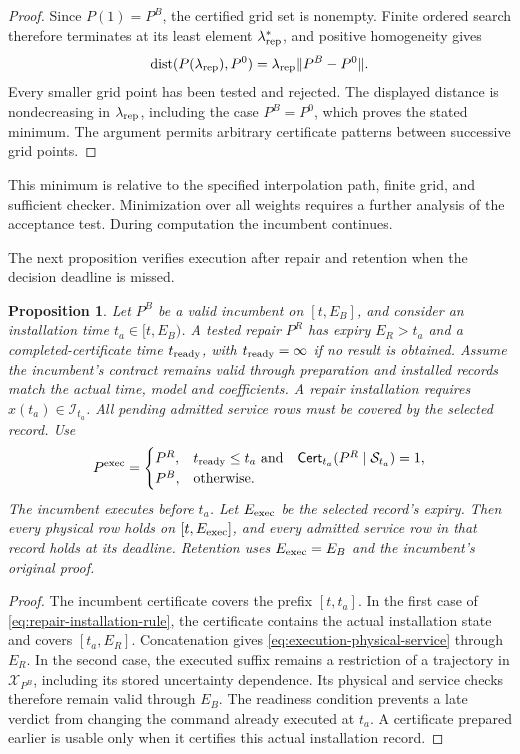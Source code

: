 \documentclass[preprint,12pt]{elsarticle}
\newtheorem{proposition}{Proposition}
\begin{document}
\begin{proof}
Since $P(1)=P^B$, the certified grid set is nonempty. Finite ordered search
therefore terminates at its least element $\lambda_{\rm rep}^*$, and positive
homogeneity gives
\[
\operatorname{dist}(P(\lambda_{\rm rep}),P^0)=\lambda_{\rm rep}\|P^B-P^0\|.
\]
Every smaller grid point has been tested and rejected. The displayed
distance is nondecreasing in $\lambda_{\rm rep}$, including the case $P^B=P^0$,
which proves the stated minimum. The argument permits arbitrary certificate
patterns between successive grid points.
\end{proof}

This minimum is relative to the specified interpolation path, finite grid,
and sufficient checker. Minimization over all weights requires a further
analysis of the acceptance test. During computation the incumbent continues.

The next proposition verifies execution after repair and retention when
the decision deadline is missed.

\begin{proposition}
\label{prop:repair-execution}
Let $P^B$ be a valid incumbent on $[t,E_B]$, and consider an
installation time $t_a\in[t,E_B)$. A tested repair $P^R$ has expiry
$E_R>t_a$ and a completed-certificate time $t_{\rm ready}$, with
$t_{\rm ready}=\infty$ if no result is obtained. Assume the incumbent's
contract remains valid through preparation and installed records match the
actual time, model and coefficients. A repair installation requires
$x(t_a)\in\mathcal I_{t_a}$. All pending admitted service rows must be
covered by the selected record. Use
\begin{equation}
P^{\rm exec}=\begin{cases}
P^R,&t_{\rm ready}\le t_a\ \text{and}\quad
 \mathsf{Cert}_{t_a}(P^R\mid\mathcal S_{t_a})=1,\\
P^B,&\text{otherwise}.
\end{cases}
\label{eq:repair-installation-rule}
\end{equation}
The incumbent executes before $t_a$. Let $E_{\rm exec}$ be the selected
record's expiry. Then every physical row holds on $[t,E_{\rm exec}]$,
and every admitted service row in that record holds at its deadline.
Retention uses $E_{\rm exec}=E_B$ and the incumbent's original proof.
\end{proposition}

\begin{proof}
The incumbent certificate covers the prefix $[t,t_a]$. In the first
case of \eqref{eq:repair-installation-rule}, the certificate contains the
actual installation state and covers $[t_a,E_R]$. Concatenation gives
\eqref{eq:execution-physical-service} through $E_R$. In the second case,
the executed suffix remains a restriction of a trajectory in
$\mathcal X_{P^B}$, including its stored uncertainty dependence.
Its physical and service checks therefore remain valid through $E_B$.
The readiness condition prevents a late verdict from changing the command
already executed at $t_a$. A certificate prepared earlier is usable only
when it certifies this actual installation record.
\end{proof}
\end{document}
